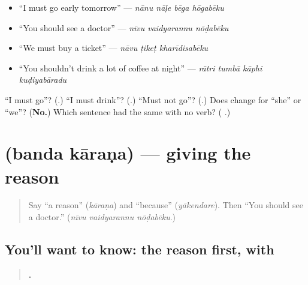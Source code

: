 \begin{itemize}
\raggedright
  \item \textquotedblleft{}I must go early tomorrow\textquotedblright{} — \emph{nānu nāḷe bēga hōgabēku}
  \item \textquotedblleft{}You should see a doctor\textquotedblright{} — \emph{nīvu vaidyarannu nōḍabēku}
  \item \textquotedblleft{}We must buy a ticket\textquotedblright{} — \emph{nāvu ṭikeṭ kharīdisabēku}
  \item \textquotedblleft{}You shouldn't drink a lot of coffee at night\textquotedblright{} — \emph{rātri tumbā kāphi kuḍiyabāradu}
\end{itemize}

\begin{tcolorbox}[breakable,colback=teal!4,colframe=teal!35!black,title={Before you move on}]
\textquotedblleft{}I must go\textquotedblright{}? (\textbf{}.) \textquotedblleft{}I must drink\textquotedblright{}? (\textbf{}.) \textquotedblleft{}Must not go\textquotedblright{}? (\textbf{}.) Does \textbf{} change for \textquotedblleft{}she\textquotedblright{} or \textquotedblleft{}we\textquotedblright{}? (\textbf{No.}) Which sentence had the same \textbf{} with no verb? (\textbf{  }.)
\end{tcolorbox}
\section[\texorpdfstring{\kn{ಬಂದ} \kn{ಕಾರಣ} (banda kāraṇa)}{ಬಂದ ಕಾರಣ (banda kāraṇa)}]{  (banda kāraṇa) — giving the reason}

\label{lesson:KA-C312-banda-karana}



\begin{quote}
Say \textquotedblleft{}a reason\textquotedblright{} (\emph{kāraṇa}) and \textquotedblleft{}because\textquotedblright{} (\emph{yākendare}). Then \textquotedblleft{}You should see a doctor.\textquotedblright{} (\emph{nīvu vaidyarannu nōḍabēku}.)
\end{quote}

\subsection*{You'll want to know: the reason first, with }
\begin{quote}
\textbf{     .}
\end{quote}

